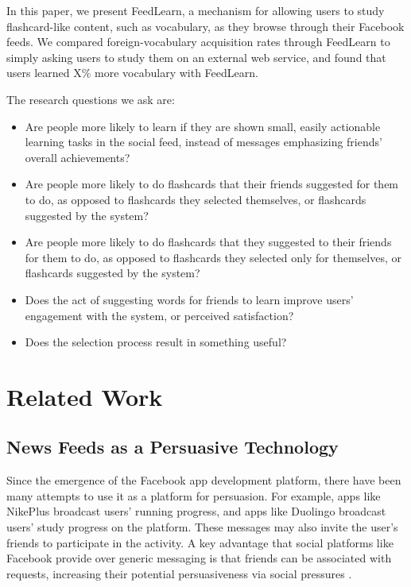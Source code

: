 \documentclass{chi-ext}
\begin{document}
In this paper, we present FeedLearn, a mechanism for allowing users to study flashcard-like content, such as vocabulary, as they browse through their Facebook feeds. We compared foreign-vocabulary acquisition rates through FeedLearn to simply asking users to study them on an external web service, and found that users learned X\% more vocabulary with FeedLearn.

The research questions we ask are:

\begin{itemize}
\item Are people more likely to learn if they are shown small, easily actionable learning tasks in the social feed, instead of messages emphasizing friends' overall achievements?
\item  Are people more likely to do flashcards that their friends suggested for them to do, as opposed to flashcards they selected themselves, or flashcards suggested by the system?
\item  Are people more likely to do flashcards that they suggested to their friends for them to do, as opposed to flashcards they selected only for themselves, or flashcards suggested by the system?
\item Does the act of suggesting words for friends to learn improve users' engagement with the system, or perceived satisfaction?
\item Does the selection process result in something useful?
\end{itemize}

\section{Related Work}

\subsection{News Feeds as a Persuasive Technology}

Since the emergence of the Facebook app development platform, there have been
many attempts to use it as a platform for persuasion. For example, apps like NikePlus broadcast users' running progress, and apps like Duolingo broadcast users' study progress on the platform. These messages may also invite the user's friends to participate in the activity. A key advantage that social platforms like Facebook provide over generic messaging is that friends can be associated with requests, increasing their potential persuasiveness via social pressures \cite{foggfacebook}.
\end{document}
